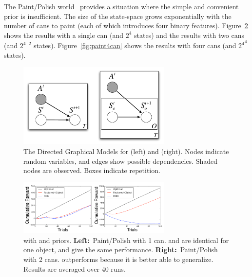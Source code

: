 The Paint/Polish world~\cite{walsh09a} provides a situation where the simple and convenient  prior is insufficient. The size of the state-space grows exponentially with the number of cans to paint (each of which introduces four binary features). Figure~\ref{fig:paint1-2can} shows the results with a single can (and $2^4$ states) and the results with two cans (and $2^{4\cdot 2}$ states). Figure~\ref{fig:paint4can} shows the results with four cans (and ${2^4}^4$ states).


\begin{figure}
\vskip 0.2in
\begin{center}
\centerline{\includegraphics[width=3in]{figures/dgms}}
\caption{
The Directed Graphical Models for  (left) and  (right). Nodes indicate random variables, and edges show possible dependencies. Shaded nodes are observed. Boxes indicate repetition.
}
\label{fig:dgms}
\end{center}
\vskip -0.2in
\end{figure} 

\begin{figure}
\vskip 0.2in
\begin{center}
\centerline{\includegraphics[width=3in]{figures/paint1-2can}}
\caption{
 with  and  priors. {\bf Left:}~Paint/Polish with 1 can.  and  are identical for one object, and give the same performance. {\bf Right:}~Paint/Polish with 2 cans.  outperforms  because it is better able to generalize. Results are averaged over $40$ runs.
}
\label{fig:paint1-2can}
\end{center}
\vskip -0.2in
\end{figure} 


